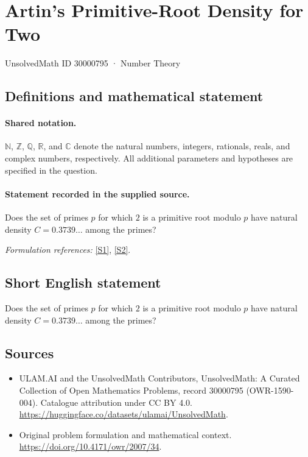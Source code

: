 \documentclass[11pt]{article}
\newcommand{\sref}[2]{\hyperlink{source:#1:#2}{[S#2]}}
\begin{document}
\setcounter{section}{30000794}
\section{Artin’s Primitive-Root Density for Two}\label{30000795}
{\small UnsolvedMath ID 30000795 · Number Theory}
\subsection{Definitions and mathematical statement}

\paragraph{Shared notation.}$\mathbb N$, $\mathbb Z$, $\mathbb Q$, $\mathbb R$, and $\mathbb C$ denote the natural numbers, integers, rationals, reals, and complex numbers, respectively. All additional parameters and hypotheses are specified in the question.


\paragraph{Statement recorded in the supplied source.}
Does the set of primes $p$ for which $2$ is a primitive root modulo $p$ have natural density $C=0.3739\ldots$ among the primes?
\par\smallskip\textit{Formulation references:} \sref{30000795}{1}, \sref{30000795}{2}.
\subsection{Short English statement}
Does the set of primes $p$ for which $2$ is a primitive root modulo $p$ have natural density $C=0.3739\ldots$ among the primes?
\subsection{Sources}
\begin{itemize}
\item[\hypertarget{source:30000795:1}{S1}] ULAM.AI and the UnsolvedMath Contributors, UnsolvedMath: A Curated Collection of Open Mathematics Problems, record 30000795 (OWR-1590-004). Catalogue attribution under CC BY 4.0.
\url{https://huggingface.co/datasets/ulamai/UnsolvedMath}.
\item[\hypertarget{source:30000795:2}{S2}] Original problem formulation and mathematical context.
\url{https://doi.org/10.4171/owr/2007/34}.
\end{itemize}
\label{end:30000795}
\end{document}
